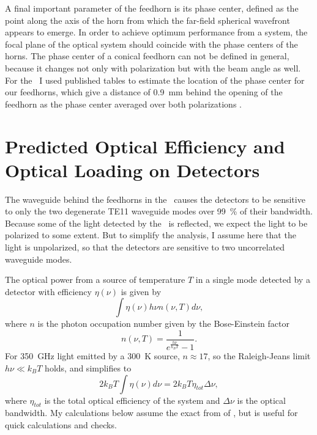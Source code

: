 A final important parameter of the feedhorn is its phase center, defined as the point along the axis of the horn from which the far-field spherical wavefront appears to emerge.
In order to achieve optimum performance from a system, the focal plane of the optical system should coincide with the phase centers of the horns.
The phase center of a conical feedhorn can not be defined in general, because it changes not only with polarization but with the beam angle as well.
For the \Imager\ I used published tables to estimate the location of the phase center for our feedhorns, which give a distance of \SI{0.9}{\mm} behind the opening of the feedhorn as the phase center averaged over both polarizations \cite[Page~353]{thomas_a._milligan_modern_2005}.

\section{Predicted Optical Efficiency and Optical Loading on Detectors} \label{sec:ch4-opt-eff}

The waveguide behind the feedhorns in the \Imager\ causes the detectors to be sensitive to only the two degenerate TE11 waveguide modes over \SI{99}{\percent} of their bandwidth.
Because some of the light detected by the \Imager\ is reflected, we expect the light to be polarized to some extent.
But to simplify the analysis, I assume here that the light is unpolarized, so that the detectors are sensitive to two uncorrelated waveguide modes.

The optical power from a source of temperature $T$ in a single mode detected by a detector with efficiency $\eta(\nu)$ is given by \cite{zmuidzinas_thermal_2003}
\begin{equation} \label{eqn:ch4-power-per-mode}
  \int \eta(\nu) h \nu n(\nu,T) d \nu ,
\end{equation}
where $n$ is the photon occupation number given by the Bose-Einstein factor
\begin{equation} \label{eqn:ch4-photon-n}
  n(\nu,T) = \frac{1}{e^{\frac{h \nu}{k_B T}} -1}.
\end{equation}
For \SI{350}{\GHz} light emitted by a \SI{300}{\K} source, $n \approx 17$, so the Raleigh-Jeans limit $h \nu \ll k_B T$ holds, and  simplifies to
\begin{equation} \label{eqn:ch4-power-per-mode-rj}
  2 k_B T \int \eta(\nu) d \nu = 2 k_B T \eta_{tot} \Delta \nu,
\end{equation}
where $\eta_{tot}$ is the total optical efficiency of the system and $\Delta \nu$ is the optical bandwidth.
My calculations below assume the exact from of , but  is useful for quick calculations and checks.

